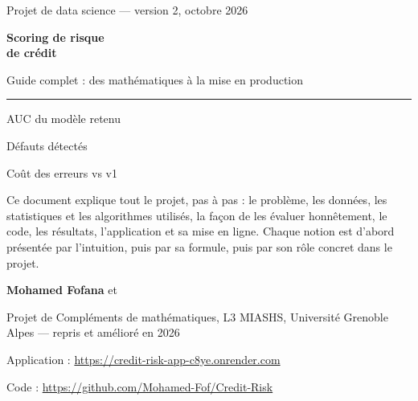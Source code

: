 \documentclass[11pt,a4paper]{article}
\begin{document}
\begin{titlepage}
\vspace*{2cm}
{\sffamily\color{gris}\large Projet de data science — version 2, octobre 2026}\par\vspace{0.6cm}
{\sffamily\bfseries\color{bleu}\fontsize{30}{36}\selectfont Scoring de risque\\[0.2em] de crédit}\par\vspace{0.6cm}
{\sffamily\Large Guide complet : des mathématiques à la mise en production}\par\vspace{1.2cm}
{\color{bleuclair}\rule{\linewidth}{1.2pt}}\par\vspace{0.8cm}
\newcommand{\chiffrecle}[2]{\begin{minipage}[t]{0.31\linewidth}{\sffamily\color{gris}\small #1}\par\vspace{0.35em}{\sffamily\bfseries\fontsize{26}{30}\selectfont #2}\end{minipage}}
\noindent\chiffrecle{AUC du modèle retenu}{\aucXgb}\hfill\chiffrecle{Défauts détectés}{\rappelXgb}\hfill\chiffrecle{Coût des erreurs vs v1}{$-$\gainCout}\par\vspace{1cm}
Ce document explique tout le projet, pas à pas : le problème, les données, les statistiques et les algorithmes utilisés, la façon de les évaluer honnêtement, le code, les résultats, l'application et sa mise en ligne. Chaque notion est d'abord présentée par l'intuition, puis par sa formule, puis par son rôle concret dans le projet.\par
\vfill
{\sffamily\bfseries Mohamed Fofana} \quad et \par
{\color{gris} Projet de Compléments de mathématiques, L3 MIASHS, Université Grenoble Alpes — repris et amélioré en 2026}\par\vspace{0.3cm}
Application : \url{https://credit-risk-app-c8ye.onrender.com}\par
Code : \url{https://github.com/Mohamed-Fof/Credit-Risk}
\end{titlepage}

\tableofcontents
\newpage

\end{document}
